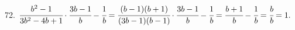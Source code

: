 72. $\cfrac{b^2-1}{3b^2-4b+1}\cdot\cfrac{3b-1}{b}-\cfrac{1}{b}=
\cfrac{(b-1)(b+1)}{(3b-1)(b-1)}\cdot\cfrac{3b-1}{b}-\cfrac{1}{b}=\cfrac{b+1}{b}-\cfrac{1}{b}=\cfrac{b}{b}=1.$\\
